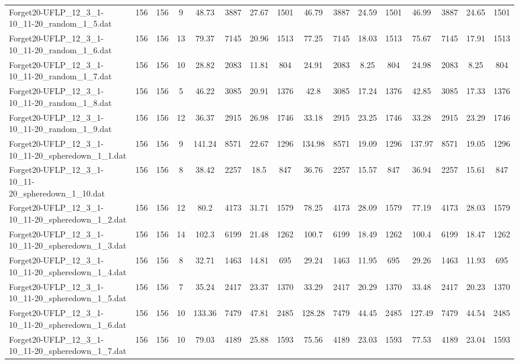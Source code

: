 \begin{sidewaystable}[!ht]
{\begin{tabular}{lccccccccccccccc}
Forget20-UFLP\_12\_3\_1-10\_11-20\_random\_1\_5.dat & 156 & 156 & 9 & 48.73 & 3887 & 27.67 & 1501 & 46.79 & 3887 &  \textcolor{blue2}{24.59} & 1501 & 46.99 & 3887 & 24.65 & 1501 \\
Forget20-UFLP\_12\_3\_1-10\_11-20\_random\_1\_6.dat & 156 & 156 & 13 & 79.37 & 7145 & 20.96 & 1513 & 77.25 & 7145 & 18.03 & 1513 & 75.67 & 7145 & 17.91 & 1513 \\
Forget20-UFLP\_12\_3\_1-10\_11-20\_random\_1\_7.dat & 156 & 156 & 10 & 28.82 & 2083 & 11.81 & 804 & 24.91 & 2083 & 8.25 & 804 & 24.98 & 2083 & 8.25 & 804 \\
Forget20-UFLP\_12\_3\_1-10\_11-20\_random\_1\_8.dat & 156 & 156 & 5 & 46.22 & 3085 & 20.91 & 1376 & 42.8 & 3085 &  \textcolor{blue2}{17.24} & 1376 & 42.85 & 3085 & 17.33 & 1376 \\
Forget20-UFLP\_12\_3\_1-10\_11-20\_random\_1\_9.dat & 156 & 156 & 12 & 36.37 & 2915 & 26.98 & 1746 & 33.18 & 2915 & 23.25 & 1746 & 33.28 & 2915 & 23.29 & 1746 \\
Forget20-UFLP\_12\_3\_1-10\_11-20\_spheredown\_1\_1.dat & 156 & 156 & 9 & 141.24 & 8571 & 22.67 & 1296 & 134.98 & 8571 & 19.09 & 1296 & 137.97 & 8571 & 19.05 & 1296 \\
Forget20-UFLP\_12\_3\_1-10\_11-20\_spheredown\_1\_10.dat & 156 & 156 & 8 & 38.42 & 2257 & 18.5 & 847 & 36.76 & 2257 &  \textcolor{blue2}{15.57} & 847 & 36.94 & 2257 & 15.61 & 847 \\
Forget20-UFLP\_12\_3\_1-10\_11-20\_spheredown\_1\_2.dat & 156 & 156 & 12 & 80.2 & 4173 & 31.71 & 1579 & 78.25 & 4173 & 28.09 & 1579 & 77.19 & 4173 & 28.03 & 1579 \\
Forget20-UFLP\_12\_3\_1-10\_11-20\_spheredown\_1\_3.dat & 156 & 156 & 14 & 102.3 & 6199 & 21.48 & 1262 & 100.7 & 6199 & 18.49 & 1262 & 100.4 & 6199 &  \textcolor{blue2}{18.47} & 1262 \\
Forget20-UFLP\_12\_3\_1-10\_11-20\_spheredown\_1\_4.dat & 156 & 156 & 8 & 32.71 & 1463 & 14.81 & 695 & 29.24 & 1463 & 11.95 & 695 & 29.26 & 1463 & 11.93 & 695 \\
Forget20-UFLP\_12\_3\_1-10\_11-20\_spheredown\_1\_5.dat & 156 & 156 & 7 & 35.24 & 2417 & 23.37 & 1370 & 33.29 & 2417 & 20.29 & 1370 & 33.48 & 2417 & 20.23 & 1370 \\
Forget20-UFLP\_12\_3\_1-10\_11-20\_spheredown\_1\_6.dat & 156 & 156 & 10 & 133.36 & 7479 & 47.81 & 2485 & 128.28 & 7479 & 44.45 & 2485 & 127.49 & 7479 & 44.54 & 2485 \\
Forget20-UFLP\_12\_3\_1-10\_11-20\_spheredown\_1\_7.dat & 156 & 156 & 10 & 79.03 & 4189 & 25.88 & 1593 & 75.56 & 4189 & 23.03 & 1593 & 77.53 & 4189 & 23.04 & 1593 \\

\end{tabular}}
\end{sidewaystable}
